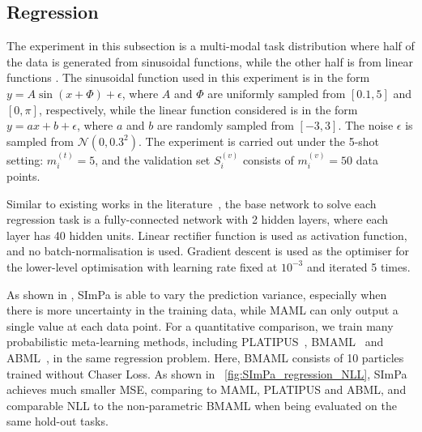     \subsection{Regression}
    \label{sec:regression}
    	The experiment in this subsection is a multi-modal task distribution where half of the data is generated from sinusoidal functions, while the other half is from linear functions \cite{finn2018probabilistic}. The sinusoidal function used in this experiment is in the form \(y = A\sin(x + \Phi) + \epsilon\), where \(A\) and \(\Phi\) are uniformly sampled from \([0.1, 5]\) and \([0, \pi]\), respectively, while the linear function considered is in the form \({y=ax + b + \epsilon}\), where \(a\) and \(b\) are randomly sampled from \([-3, 3]\). The noise \(\epsilon\) is sampled from \(\mathcal{N}(0, 0.3^{2})\). The experiment is carried out under the 5-shot setting: \(m_{i}^{(t)} = 5\), and the validation set \(S_{i}^{(v)}\) consists of \(m_{i}^{(v)} = 50\) data points. 

        Similar to existing works in the literature~\citep{finn2018probabilistic}, the base network to solve each regression task is a fully-connected network with 2 hidden layers, where each layer has 40 hidden units. Linear rectifier function is used as activation function, and no batch-normalisation is used. Gradient descent is used as the optimiser for the lower-level optimisation with learning rate fixed at \(10^{-3}\) and iterated 5 times.
        
        As shown in \figureautorefname{~\ref{fig:regression_visualisation}}, SImPa is able to vary the prediction variance, especially when there is more uncertainty in the training data, while MAML can only output a single value at each data point. For a quantitative comparison, we train many probabilistic meta-learning methods, including PLATIPUS~\cite{finn2018probabilistic}, BMAML~\cite{yoon2018bayesian} and ABML~\cite{ravi2018amortized}, in the same regression problem. Here, BMAML consists of 10 particles trained without Chaser Loss. As shown in \figureautorefname~\ref{fig:SImPa_regression_NLL}, SImPa achieves much smaller MSE, comparing to MAML, PLATIPUS and ABML, and comparable NLL to the non-parametric BMAML when being evaluated on the same hold-out tasks.

